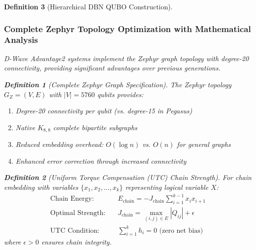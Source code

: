 \documentclass{article}
\newtheorem{definition}{Definition}
\begin{document}
\begin{definition}[Hierarchical DBN QUBO Construction]
\subsubsection{Complete Zephyr Topology Optimization with Mathematical Analysis}

D-Wave Advantage2 systems implement the Zephyr graph topology with degree-20 connectivity, providing significant advantages over previous generations.

\begin{definition}[Complete Zephyr Graph Specification]
The Zephyr topology $G_Z = (V, E)$ with $|V| = 5760$ qubits provides:
\begin{enumerate}
\item Degree-20 connectivity per qubit (vs. degree-15 in Pegasus)
\item Native $K_{8,8}$ complete bipartite subgraphs
\item Reduced embedding overhead: $O(\log n)$ vs. $O(n)$ for general graphs
\item Enhanced error correction through increased connectivity
\end{enumerate}
\end{definition}

\begin{definition}[Uniform Torque Compensation (UTC) Chain Strength]
For chain embedding with variables $\{x_1, x_2, \ldots, x_k\}$ representing logical variable $X$:
\begin{align}
\text{Chain Energy:} \quad &E_{\text{chain}} = -J_{\text{chain}} \sum_{i=1}^{k-1} x_i x_{i+1}\\
\text{Optimal Strength:} \quad &J_{\text{chain}} = \max_{(i,j) \in E} |Q_{ij}| + \epsilon\\
\text{UTC Condition:} \quad &\sum_{i=1}^k h_i = 0 \text{ (zero net bias)}
\end{align}
where $\epsilon > 0$ ensures chain integrity.
\end{definition}


\end{definition}
\end{document}
